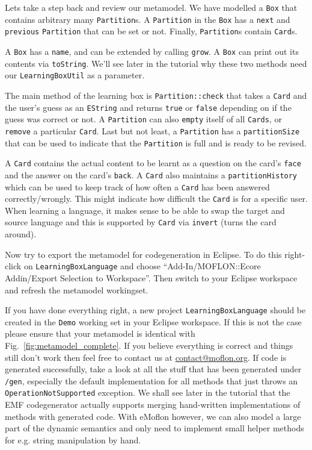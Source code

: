 Lets take a step back and review our metamodel.  We have modelled a \texttt{Box}
that contains arbitrary many \texttt{Partition}s.  A \texttt{Partition} in the
\texttt{Box} has a \texttt{next} and \texttt{previous} \texttt{Partition} that
can be set or not. Finally, \texttt{Partition}s contain \texttt{Card}s.

A \texttt{Box} has a \texttt{name}, and can be extended by calling
\texttt{grow}. A \texttt{Box} can print out its contents via \texttt{toString}. 
We'll see later in the tutorial why these two methods need our
\texttt{LearningBoxUtil} as a parameter.

The main method of the learning box is \texttt{Partition::check} that takes a
\texttt{Card} and the user's guess as an \texttt{EString} and returns
\texttt{true} or \texttt{false} depending on if the guess was correct or not.
A \texttt{Partition} can also \texttt{empty} itself of all \texttt{Cards}, or
\texttt{remove} a particular \texttt{Card}.  Last but not least, a
\texttt{Partition} has a \texttt{partitionSize} that can be used to indicate
that the \texttt{Partition} is full and is ready to be revised.

A \texttt{Card} contains the actual content to be learnt as a question on the
card's \texttt{face} and the answer on the card's \texttt{back}. A \texttt{Card}
also maintains a \texttt{partition\-History} which can be used to keep track of
how often a \texttt{Card} has been answered correctly/wrongly.  This might
indicate how difficult the \texttt{Card} is for a specific user.
When learning a language, it makes sense to be able to swap the target and
source language and this is supported by \texttt{Card} via \texttt{invert}
(turns the card around).

Now try to export the metamodel for codegeneration in Eclipse.  To do this
right-click on \texttt{LearningBoxLanguage} and choose ``Add-In/MOFLON::Ecore
Addin/Export Selection to Workspace''.  Then switch to your Eclipse work\-space
and refresh the metamodel workingset.

If you have done everything right, a new project \texttt{LearningBoxLanguage}
should be created in the \texttt{Demo} working set in your Eclipse workspace.
If this is not the case please ensure that your metamodel is identical with
Fig.~\ref{fig:metamodel_complete}.  If you believe everything is correct and
things still don't work then feel free to contact us at
\href{mailto:contact@moflon.org}{contact@moflon.org}.  If code is generated
successfully, take a look at all the stuff that has been generated under
\texttt{/gen}, especially the default  implementation for all methods that just
throws an  \texttt{OperationNotSupported} exception.  We shall see later in the
tutorial  that the EMF codegenerator actually supports merging hand-written
implementations of methods with generated code.  With eMoflon however, we can
also model a large part of the dynamic semantics and only need to implement
small helper methods for e.g. string manipulation by hand.

